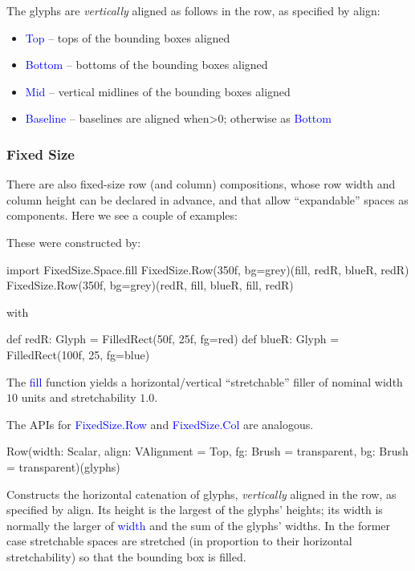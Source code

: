 \documentclass[12pt,a4paper]{article}
\def\Scala#1{\textcolor{blue}{\textsf{#1}}}
\def\SSS#1{\subsubsection*{#1}}
\begin{document}
The glyphs are \textit{vertically} aligned as follows in the row, as specified
by align:

\begin{itemize}
\item \Scala{Top}   --     tops of the bounding boxes aligned
\item \Scala{Bottom} --    bottoms of the bounding boxes aligned
\item \Scala{Mid} --       vertical midlines of the bounding boxes aligned
\item \Scala{Baseline} --  baselines are aligned when>0; otherwise as \Scala{Bottom}
\end{itemize}

\SSS{Fixed Size}
There are also fixed-size row (and column)
compositions, whose row width and column height can be declared in advance,
and that allow ``expandable'' spaces as components. Here we see a
couple of examples:

\begin{center}
\quad\quad
{}
\end{center}

These were constructed by:
\begin{scala}
import FixedSize.Space.fill
FixedSize.Row(350f, bg=grey)(fill, redR, blueR, redR)
FixedSize.Row(350f, bg=grey)(redR, fill, blueR, fill, redR)
\end{scala}
with
\begin{scala}
def redR:  Glyph = FilledRect(50f, 25f, fg=red)
def blueR: Glyph = FilledRect(100f, 25, fg=blue)
\end{scala}

The \Scala{fill} function yields a horizontal/vertical ``stretchable''
filler of nominal width $10$ units and stretchability $1.0$.

The APIs for \Scala{FixedSize.Row} and \Scala{FixedSize.Col} are analogous.
\begin{scala}
        Row(width: Scalar,
            align: VAlignment = Top,
            fg:    Brush      = transparent,
            bg:    Brush      = transparent)(glyphs)
\end{scala}
Constructs the horizontal catenation of glyphs, \textit{vertically} aligned
in the row, as specified by align.  Its height is the largest of the
glyphs' heights; its width is normally the larger of \Scala{width} and the
sum of the glyphs' widths.  In the former case stretchable spaces are
stretched (in proportion to their horizontal stretchability) so that
the bounding box is filled.
\end{document}
